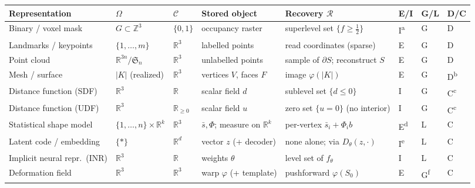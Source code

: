 \begin{table}[htbp]
    \centering
    \footnotesize
    \setlength{\tabcolsep}{4pt}
    \renewcommand{\arraystretch}{1.25}
    \begin{tabularx}{\textwidth}{@{}l l l l X l l l@{}}
        \toprule
        Representation & $\Omega$ & $\mathcal{C}$ & Stored object & Recovery $\mathcal{R}$ & E/I & G/L & D/C \\
        \midrule
        Binary / voxel mask
            & $G \subset \mathbb{Z}^3$ & $\{0,1\}$ & occupancy raster
            & superlevel set $\{f \ge \tfrac12\}$ & I\textsuperscript{a} & G & D \\
        Landmarks / keypoints
            & $\{1,\dots,m\}$ & $\mathbb{R}^3$ & labelled points
            & read coordinates (sparse) & E & G & D \\
        Point cloud
            & $\mathbb{R}^{3n}/\mathfrak{S}_n$ & $\mathbb{R}^3$ & unlabelled points
            & sample of $\partial S$; reconstruct $S$ & E & G & D \\
        Mesh / surface
            & $|K|$ (realized) & $\mathbb{R}^3$ & vertices $V$, faces $F$
            & image $\varphi(|K|)$ & E & G & D\textsuperscript{b} \\
        Distance function (SDF)
            & $\mathbb{R}^3$ & $\mathbb{R}$ & scalar field $d$
            & sublevel set $\{d \le 0\}$ & I & G & C\textsuperscript{c} \\
        Distance function (UDF)
            & $\mathbb{R}^3$ & $\mathbb{R}_{\ge 0}$ & scalar field $u$
            & zero set $\{u=0\}$ (no interior) & I & G & C\textsuperscript{c} \\
        Statistical shape model
            & $\{1,\dots,n\}\!\times\!\mathbb{R}^k$ & $\mathbb{R}^3$ & $\bar{s}, \Phi$; measure on $\mathbb{R}^k$
            & per-vertex $\bar{s}_i + \Phi_i b$ & E\textsuperscript{d} & L & C \\
        Latent code / embedding
            & $\{*\}$ & $\mathbb{R}^d$ & vector $z$ (+ decoder)
            & none alone; via $D_\theta(z,\cdot)$ & I\textsuperscript{e} & L & C \\
        Implicit neural repr.\ (INR)
            & $\mathbb{R}^3$ & $\mathbb{R}$ & weights $\theta$
            & level set of $f_\theta$ & I & L & C \\
        Deformation field
            & $\mathbb{R}^3$ & $\mathbb{R}^3$ & warp $\varphi$ (+ template)
            & pushforward $\varphi(S_0)$ & E & G\textsuperscript{f} & C \\

\end{tabularx}
\end{table}
